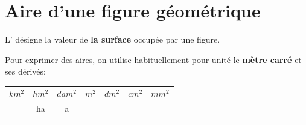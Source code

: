 \section{Aire d'une figure géométrique} 


\begin{aconnaitre}
L'  désigne la valeur de \textbf{\textcolor{H1}{la surface}} occupée par une figure.\\
\begin{center}
\end{center}

Pour exprimer des aires, on utilise habituellement pour unité le \textbf{\textcolor{H1}{mètre carré}} et ses dérivés:
\begin{center}
    \begin{tabular}{|c|c|c|c|c|c|c|c|c|c|c|c|c|c|}
     \hline
     \multicolumn{2}{|c|}{$km^2$} & 
     \multicolumn{2}{c|}{$hm^2$} &
     \multicolumn{2}{c|}{$dam^2$} & 
     \multicolumn{2}{c|}{$m^2$} & 
     \multicolumn{2}{c|}{$dm^2$}  & 
     \multicolumn{2}{c|}{$cm^2$}  & 
     \multicolumn{2}{c|}{$mm^2$}  \\
     \multicolumn{2}{|c|}{} & 
     \multicolumn{2}{c|}{ha} &
     \multicolumn{2}{c|}{a} & 
     \multicolumn{2}{c|}{} & 
     \multicolumn{2}{c|}{}  & 
     \multicolumn{2}{c|}{}  & 
     \multicolumn{2}{c|}{}  \\ \hline
         & & & & & & & & & & & & & \\
    \hline
    \end{tabular}
\end{center}
\end{aconnaitre}

